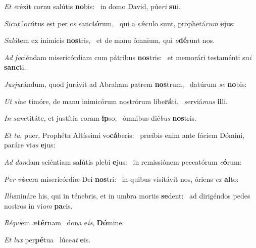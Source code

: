 \item \textit{Et e}réxit cornu salútis \textbf{no}bis:~\psstar{} in domo David, púe\textit{ri} \textbf{su}i.

\item \textit{Sicut} locútus est per os sanc\textbf{tó}rum,~\psstar{} qui a sǽculo sunt, prophetá\textit{rum} \textbf{e}jus:

\item \textit{Salú}tem ex inimícis \textbf{nos}tris,~\psstar{} et de manu ómnium, qui \textit{o}\textbf{dé}runt nos.

\item \textit{Ad fa}ciéndam misericórdiam cum pátribus \textbf{nos}tris:~\psstar{} et memorári testaménti su\textit{i} \textbf{sanc}ti.

\item \textit{Jusju}rándum, quod jurávit ad Abraham patrem \textbf{nos}trum,~\psstar{} datúrum \textit{se} \textbf{no}bis:

\item \textit{Ut si}ne timóre, de manu inimicórum nostrórum libe\textbf{rá}ti,~\psstar{} serviá\textit{mus} \textbf{il}li.

\item \textit{In san}ctitáte, et justítia coram \textbf{ip}so,~\psstar{} ómnibus dié\textit{bus} \textbf{nos}tris.

\item \textit{Et tu}, puer, Prophéta Altíssimi vo\textbf{cá}beris:~\psstar{} præíbis enim ante fáciem Dómini, paráre vi\textit{as} \textbf{e}jus:

\item \textit{Ad dan}dam sciéntiam salútis plebi \textbf{e}jus:~\psstar{} in remissiónem peccatórum \textit{e}\textbf{ó}rum:

\item \textit{Per ví}scera misericórdiæ Dei \textbf{nos}tri:~\psstar{} in quibus visitávit nos, óriens \textit{ex} \textbf{al}to:

\item \textit{Illu}mináre his, qui in ténebris, et in umbra mortis \textbf{se}dent:~\psstar{} ad dirigéndos pedes nostros in vi\textit{am} \textbf{pa}cis.

\item \textit{Réqui}em æ\textbf{tér}nam~\psstar{} dona e\textit{is}, \textbf{Dó}mine.

\item \textit{Et lux} per\textbf{pé}tua~\psstar{} lúce\textit{at} \textbf{e}is.